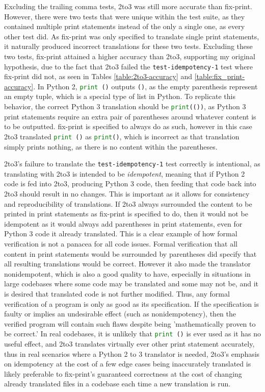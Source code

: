 Excluding the trailing comma tests, 2to3 was still more accurate than fix-print. However, there were two tests that were unique within the test suite, as they contained multiple print statements instead of the only a single one, as every other test did. As fix-print was only specified to translate single print statements, it naturally produced incorrect translations for these two tests. Excluding these two tests, fix-print attained a higher accuracy than 2to3, supporting my original hypothesis, due to the fact that 2to3 failed the \verb|test-idempotency-1| test where fix-print did not, as seen in Tables \ref{table:2to3-accuracy} and \ref{table:fix_print-accuracy}. In Python 2, \lstinline[language=Python, style=pythonstyle]|print ()| outputs \verb|()|, as the empty parenthesis represent an empty tuple, which is a special type of list in Python. To replicate this behavior, the correct Python 3 translation should be \lstinline[language=Python, style=pythonstyle]|print(())|, as Python 3 print statements require an extra pair of parentheses around whatever content is to be outputted. fix-print is specified to always do as such, however in this case 2to3 translated \lstinline[language=Python, style=pythonstyle]|print ()| as \lstinline[language=Python, style=pythonstyle]|print()|, which is incorrect as that translation simply prints nothing, as there is no content within the parentheses.

2to3's failure to translate the \verb|test-idempotency-1| test correctly is intentional, as translating with 2to3 is intended to be \textit{idempotent}, meaning that if Python 2 code is fed into 2to3, producing Python 3 code, then feeding that code back into 2to3 should result in no changes. This is important as it allows for consistency and reproducibility of translations. If 2to3 always surrounded the content to be printed in print statements as fix-print is specified to do, then it would not be idempotent as it would always add parentheses in print statements, even for Python 3 code it already translated. This is a clear example of how formal verification is not a panacea for all code issues. Formal verification that all content in print statements would be surrounded by parentheses did specify that all resulting translations would be correct. However it also made the translator nonidempotent, which is also a good quality to have, especially in situations in large codebases where some code may be translated and some may not be, and it is desired that translated code is not further modified. Thus, any formal verification of a program is only as good as its specification. If the specification is faulty or implies an undesirable effect (such as nonidempotency), then the verified program will contain such flaws despite being 'mathematically proven to be correct.' In real codebases, it is unlikely that \lstinline[language=Python, style=pythonstyle]|print ()| is ever used as it has no useful effect, and 2to3 translates virtually ever other print statement accurately, thus in real scenarios where a Python 2 to 3 translator is needed, 2to3's emphasis on idempotency at the cost of a few edge cases being inaccurately translated is likely preferable to fix-print's guaranteed correctness at the cost of changing already translated files in a codebase each time a new translation is run.


